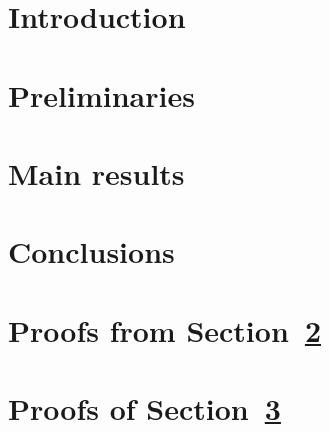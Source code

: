 \documentclass[a4paper,UKenglish]{lipics-v2021}
\begin{document}
	
	\maketitle
	
	
	
	\section{Introduction}\label{sec:introduction}
	
	
	
	\section{Preliminaries}\label{sec:preliminaries}
	
	
	
	\section{Main results}\label{sec:results}
	
	
	
	\section{Conclusions}\label{sec:conclusions}
	
	
	
	\newpage
	
	
	\newpage
	\appendix
	
	\section{Proofs from Section~\ref{sec:preliminaries}}
	
	
	
	\section{Proofs of Section~\ref{sec:results}}
	\label{app:results}
	
	
	
\end{document}
